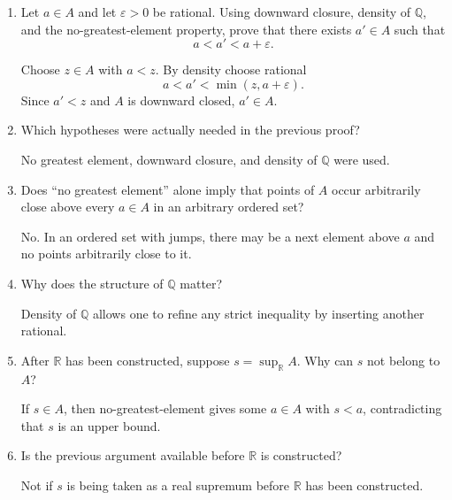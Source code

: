 \documentclass{essay}
\begin{document}
\begin{enumerate}[label=\arabic*., itemsep=10pt]
\begin{answer}
Any $b\in B$ is an upper bound for every element of $A$.
\end{answer}

\item Let $a\in A$ and let $\varepsilon>0$ be rational.
Using downward closure, density of $\mathbb{Q}$, and the no-greatest-element property, prove that there exists $a'\in A$ such that
\[
a<a'<a+\varepsilon.
\]

\begin{answer}
Choose $z\in A$ with $a<z$. By density choose rational
\[
a<a'<\min(z,a+\varepsilon).
\]
Since $a'<z$ and $A$ is downward closed, $a'\in A$.
\end{answer}

\item Which hypotheses were actually needed in the previous proof?

\begin{answer}
No greatest element, downward closure, and density of $\mathbb{Q}$ were used.
\end{answer}

\item Does ``no greatest element'' alone imply that points of $A$ occur arbitrarily close above every $a\in A$ in an arbitrary ordered set?

\begin{answer}
No. In an ordered set with jumps, there may be a next element above $a$ and no points arbitrarily close to it.
\end{answer}

\item Why does the structure of $\mathbb{Q}$ matter?

\begin{answer}
Density of $\mathbb{Q}$ allows one to refine any strict inequality by inserting another rational.
\end{answer}

\item After $\mathbb{R}$ has been constructed, suppose $s=\sup_{\mathbb{R}}A$.
Why can $s$ not belong to $A$?

\begin{answer}
If $s\in A$, then no-greatest-element gives some $a\in A$ with $s<a$, contradicting that $s$ is an upper bound.
\end{answer}

\item Is the previous argument available before $\mathbb{R}$ is constructed?

\begin{answer}
Not if $s$ is being taken as a real supremum before $\mathbb{R}$ has been constructed.
\end{answer}

\end{enumerate}
\end{document}
